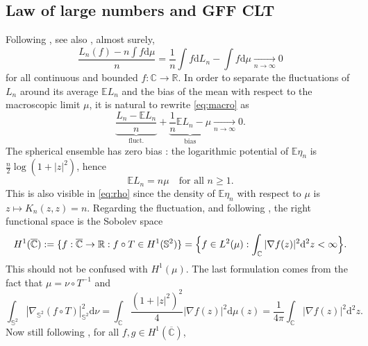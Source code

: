 \documentclass[10pt,reqno]{amsart}
\numberwithin{equation}{section}
\numberwithin{figure}{section}
\theoremstyle{plain}
\newcommand{\<}{\langle}
\renewcommand{\>}{\rangle}
\begin{document}
%
%
%
%
%
%
%
%
%
%
%
%
%
%
%
%
%

%
%
%
%
%
%
%
%
%
%


\subsection{Law of large numbers and GFF CLT}

Following \cite{MR2552864}, see also \cite{MR2926763}, almost surely,
\begin{equation}\label{eq:macro}
  \frac{L_n(f)-n\int f\mathrm{d}\mu}{n}
  =\frac{1}{n}\int f\mathrm{d}L_n-\int f\mathrm{d}\mu\xrightarrow[n\to\infty]{}0
\end{equation}
for all continuous and bounded $f:\mathbb{C}\to\mathbb{R}$. In order to
separate the fluctuations of $L_n$ around its average $\mathbb{E}L_n$
and the bias of the mean with respect to the
macroscopic limit $\mu$, it is natural to rewrite \eqref{eq:macro} as
\begin{equation}\label{eq:macro2}
  \underbrace{\frac{L_n-\mathbb{E}L_n}{n}}_{\mathrm{fluct.}}+\underbrace{\frac{1}{n}\mathbb{E}L_n-\mu}_{\mathrm{bias}}
  \xrightarrow[n\to\infty]{}0.
\end{equation}
The spherical ensemble has zero bias : the logarithmic potential of $\mathbb{E}\eta_n$ is $\frac{n}{2}\log(1+|z|^2)$, hence 
\begin{equation}\label{eq:bias}
    \mathbb{E}L_n=n\mu\quad\text{for all $n\geq1$}.
\end{equation}
This is also visible in \eqref{eq:rho} since the density of $\mathbb{E}\eta_n$ with respect to $\mu$ is $z\mapsto K_n(z,z)=n$.
Regarding the fluctuation, and following \cite{MR2346510}, the right functional space is the Sobolev space
\begin{equation}
 H^1(\overline{\mathbb{C}})
 :=\{f:\overline{\mathbb{C}}\to\mathbb{R}:f\circ T\in H^1(\mathbb{S}^2)\}
 =\Bigl\{f\in L^2(\mu):\int_{\mathbb{C}}|\nabla f(z)|^2\mathrm{d}^2z<\infty\Bigr\}.
\end{equation}
This should not be confused with $H^1(\mu)$. The last formulation comes from the fact that $\mu=\nu\circ T^{-1}$ and
\begin{equation}
\int_{\mathbb{S}^2}|\nabla_{\mathbb{S}^2}(f\circ T)|_{\mathbb{S}^2}^2\mathrm{d}\nu=\int_{\mathbb{C}}\frac{(1+|z|^2)^2}{4}|\nabla f(z)|^2\mathrm{d}\mu(z)=\frac{1}{4\pi}\int_{\mathbb{C}}|\nabla f(z)|^2\mathrm{d}^2z.
\end{equation}
Now still following \cite{MR2346510}, for all $f,g\in H^1(\overline{\mathbb{C}})$,
\end{document}
